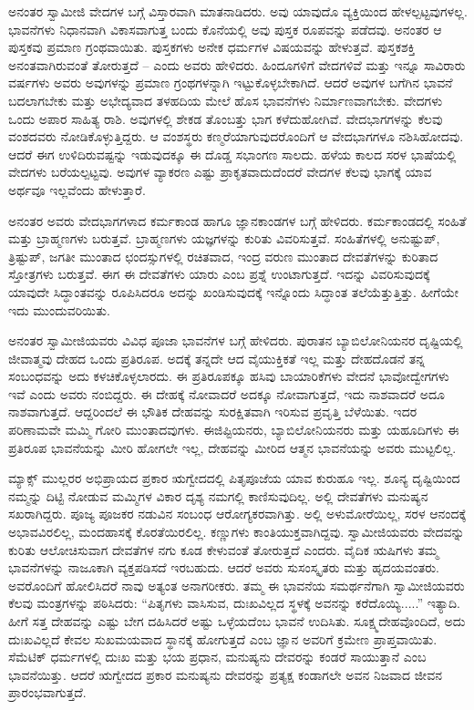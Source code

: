 ಅನಂತರ ಸ್ವಾಮೀಜಿ ವೇದಗಳ ಬಗ್ಗೆ ವಿಸ್ತಾರವಾಗಿ ಮಾತನಾಡಿದರು. ಅವು ಯಾವುದೊ ವ್ಯಕ್ತಿಯಿಂದ ಹೇಳಲ್ಪಟ್ಟವುಗಳಲ್ಲ. ಭಾವನೆಗಳು ನಿಧಾನವಾಗಿ ವಿಕಾಸವಾಗುತ್ತ ಬಂದು ಕೊನೆಯಲ್ಲಿ ಅವು ಪುಸ್ತಕ ರೂಪವನ್ನು ಪಡೆದವು. ಅನಂತರ ಆ ಪುಸ್ತಕವು ಪ್ರಮಾಣ ಗ್ರಂಥವಾಯಿತು. ಪುಸ್ತಕಗಳು ಅನೇಕ ಧರ್ಮಗಳ ವಿಷಯವನ್ನು ಹೇಳುತ್ತವೆ. ಪುಸ್ತಕಶಕ್ತಿ ಅನಂತವಾಗಿರುವಂತೆ ತೋರುತ್ತದೆ – ಎಂದು ಅವರು ಹೇಳಿದರು. ಹಿಂದೂಗಳಿಗೆ ವೇದಗಳಿವೆ ಮತ್ತು ಇನ್ನೂ ಸಾವಿರಾರು ವರ್ಷಗಳು ಅವರು ಅವುಗಳನ್ನು ಪ್ರಮಾಣ ಗ್ರಂಥಗಳನ್ನಾಗಿ ಇಟ್ಟುಕೊಳ್ಳಬೇಕಾಗಿದೆ. ಆದರೆ ಅವುಗಳ ಬಗೆಗಿನ ಭಾವನೆ ಬದಲಾಗಬೇಕು ಮತ್ತು ಅಭೇದ್ಯವಾದ ತಳಹದಿಯ ಮೇಲೆ ಹೊಸ ಭಾವನೆಗಳು ನಿರ್ಮಾಣವಾಗಬೇಕು. ವೇದಗಳು ಒಂದು ಅಪಾರ ಸಾಹಿತ್ಯ ರಾಶಿ. ಅವುಗಳಲ್ಲಿ ಶೇಕಡ ತೊಂಬತ್ತು ಭಾಗ ಕಳೆದುಹೋಗಿವೆ. ವೇದಭಾಗಗಳನ್ನು ಕೆಲವು ವಂಶದವರು ನೋಡಿಕೊಳ್ಳುತ್ತಿದ್ದರು. ಆ ವಂಶಸ್ಥರು ಕಣ್ಮರೆಯಾಗುವುದರೊಂದಿಗೆ ಆ ವೇದಭಾಗಗಳೂ ನಶಿಸಿಹೋದವು. ಆದರೆ ಈಗ ಉಳಿದಿರುವಷ್ಟನ್ನು ಇಡುವುದಕ್ಕೂ ಈ ದೊಡ್ಡ ಸಭಾಂಗಣ ಸಾಲದು. ಹಳೆಯ ಕಾಲದ ಸರಳ ಭಾಷೆಯಲ್ಲಿ ವೇದಗಳು ಬರೆಯಲ್ಪಟ್ಟವು. ಅವುಗಳ ವ್ಯಾಕರಣ ಎಷ್ಟು ಪ್ರಾಕೃತವಾದುದೆಂದರೆ ವೇದಗಳ ಕೆಲವು ಭಾಗಕ್ಕೆ ಯಾವ ಅರ್ಥವೂ ಇಲ್ಲವೆಂದು ಹೇಳುತ್ತಾರೆ. 

ಅನಂತರ ಅವರು ವೇದಭಾಗಗಳಾದ ಕರ್ಮಕಾಂಡ ಹಾಗೂ ಜ್ಞಾನಕಾಂಡಗಳ ಬಗ್ಗೆ ಹೇಳಿದರು. ಕರ್ಮಕಾಂಡದಲ್ಲಿ ಸಂಹಿತೆ ಮತ್ತು ಬ್ರಾಹ್ಮಣಗಳು ಬರುತ್ತವೆ. ಬ್ರಾಹ್ಮಣಗಳು ಯಜ್ಞಗಳನ್ನು ಕುರಿತು ವಿವರಿಸುತ್ತವೆ. ಸಂಹಿತೆಗಳಲ್ಲಿ ಅನುಷ್ಟುಪ್​, ತ್ರಿಷ್ಟುಪ್​, ಜಗತೀ ಮುಂತಾದ ಛಂದಸ್ಸುಗಳಲ್ಲಿ ರಚಿತವಾದ, ಇಂದ್ರ ವರುಣ ಮುಂತಾದ ದೇವತೆಗಳನ್ನು ಕುರಿತಾದ ಸ್ತೋತ್ರಗಳು ಬರುತ್ತವೆ. ಈಗ ಈ ದೇವತೆಗಳು ಯಾರು ಎಂಬ ಪ್ರಶ್ನೆ ಉಂಟಾಗುತ್ತದೆ. ಇದನ್ನು ವಿವರಿಸುವುದಕ್ಕೆ ಯಾವುದೇ ಸಿದ್ಧಾಂತವನ್ನು ರೂಪಿಸಿದರೂ ಅದನ್ನು ಖಂಡಿಸುವುದಕ್ಕೆ ಇನ್ನೊಂದು ಸಿದ್ಧಾಂತ ತಲೆಯೆತ್ತುತ್ತಿತ್ತು. ಹೀಗೆಯೇ ಇದು ಮುಂದುವರಿಯಿತು. 

ಅನಂತರ ಸ್ವಾಮೀಜಿಯವರು ವಿವಿಧ ಪೂಜಾ ಭಾವನೆಗಳ ಬಗ್ಗೆ ಹೇಳಿದರು. ಪುರಾತನ ಬ್ಯಾಬಿಲೋನಿಯನರ ದೃಷ್ಟಿಯಲ್ಲಿ ಜೀವಾತ್ಮವು ದೇಹದ ಒಂದು ಪ್ರತಿರೂಪ. ಅದಕ್ಕೆ ತನ್ನದೇ ಆದ ವೈಯುಕ್ತಿಕತೆ ಇಲ್ಲ ಮತ್ತು ದೇಹದೊಡನೆ ತನ್ನ ಸಂಬಂಧವನ್ನು ಅದು ಕಳಚಿಕೊಳ್ಳಲಾರದು. ಈ ಪ್ರತಿರೂಪಕ್ಕೂ ಹಸಿವು ಬಾಯಾರಿಕೆಗಳು ವೇದನೆ ಭಾವೋದ್ವೇಗಗಳು ಇವೆ ಎಂದು ಅವರು ನಂಬಿದ್ದರು. ಈ ದೇಹಕ್ಕೆ ನೋವಾದರೆ ಅದಕ್ಕೂ ನೋವಾಗುತ್ತದೆ, ಇದು ನಾಶವಾದರೆ ಅದೂ ನಾಶವಾಗುತ್ತದೆ. ಆದ್ದರಿಂದಲೆ ಈ ಭೌತಿಕ ದೇಹವನ್ನು ಸುರಕ್ಷಿತವಾಗಿ ಇರಿಸುವ ಪ್ರವೃತ್ತಿ ಬೆಳೆಯಿತು. ಇದರ ಪರಿಣಾಮವೇ ಮಮ್ಮಿ ಗೋರಿ ಮುಂತಾದವುಗಳು. ಈಜಿಪ್ಟಿಯನರು, ಬ್ಯಾಬಿಲೋನಿಯನರು ಮತ್ತು ಯಹೂದಿಗಳು ಈ ಪ್ರತಿರೂಪ ಭಾವನೆಯನ್ನು ಮೀರಿ ಹೋಗಲೇ ಇಲ್ಲ, ದೇಹವನ್ನು ಮೀರಿದ ಆತ್ಮನ ಭಾವನೆಯನ್ನು ಅವರು ಮುಟ್ಟಲಿಲ್ಲ. 

ಮ್ಯಾಕ್ಸ್ ಮುಲ್ಲರರ ಅಭಿಪ್ರಾಯದ ಪ್ರಕಾರ ಋಗ್ವೇದದಲ್ಲಿ ಪಿತೃಪೂಜೆಯ ಯಾವ ಕುರುಹೂ ಇಲ್ಲ. ಶೂನ್ಯ ದೃಷ್ಟಿಯಿಂದ ನಮ್ಮನ್ನು ದಿಟ್ಟಿ ನೋಡುವ ಮಮ್ಮಿಗಳ ವಿಕಾರ ದೃಶ್ಯ ನಮಗಲ್ಲಿ ಕಾಣಿಸುವುದಿಲ್ಲ. ಅಲ್ಲಿ ದೇವತೆಗಳು ಮನುಷ್ಯನ ಸಖರಾಗಿದ್ದರು. ಪೂಜ್ಯ ಪೂಜಕರ ನಡುವಿನ ಸಂಬಂಧ ಆರೋಗ್ಯಕರವಾಗಿತ್ತು. ಅಲ್ಲಿ ಅಳುಮೋರೆಯಿಲ್ಲ, ಸರಳ ಆನಂದಕ್ಕೆ ಅಭಾವವಿರಲಿಲ್ಲ, ಮಂದಹಾಸಕ್ಕೆ ಕೊರತೆಯಿರಲಿಲ್ಲ. ಕಣ್ಣುಗಳು ಕಾಂತಿಯುಕ್ತವಾಗಿದ್ದವು. ಸ್ವಾಮೀಜಿಯವರು ವೇದವನ್ನು ಕುರಿತು ಆಲೋಚಿಸುವಾಗ ದೇವತೆಗಳ ನಗು ಕೂಡ ಕೇಳುವಂತೆ ತೋರುತ್ತದೆ ಎಂದರು. ವೈದಿಕ ಋಷಿಗಳು ತಮ್ಮ ಭಾವನೆಗಳನ್ನು ನಾಜೂಕಾಗಿ ವ್ಯಕ್ತಪಡಿಸದೆ ಇರಬಹುದು. ಆದರೆ ಅವರು ಸುಸಂಸ್ಕೃತರು ಮತ್ತು ಹೃದಯವಂತರು. ಅವರೊಂದಿಗೆ ಹೋಲಿಸಿದರೆ ನಾವು ಅತ್ಯಂತ ಅನಾಗರೀಕರು. ತಮ್ಮ ಈ ಭಾವನೆಯ ಸಮರ್ಥನೆಗಾಗಿ ಸ್ವಾಮೀಜಿಯವರು ಕೆಲವು ಮಂತ್ರಗಳನ್ನು ಪಠಿಸಿದರು: “ಪಿತೃಗಳು ವಾಸಿಸುವ, ದುಃಖವಿಲ್ಲದ ಸ್ಥಳಕ್ಕೆ ಅವನನ್ನು ಕರೆದೊಯ್ಯಿ.....” ಇತ್ಯಾದಿ. ಹೀಗೆ ಸತ್ತ ದೇಹವನ್ನು ಎಷ್ಟು ಬೇಗ ದಹಿಸಿದರೆ ಅಷ್ಟು ಒಳ್ಳೆಯದೆಂಬ ಭಾವನೆ ಉದಿಸಿತು. ಸೂಕ್ಷ್ಮದೇಹವೊಂದಿದೆ, ಅದು ದುಃಖವಿಲ್ಲದೆ ಕೇವಲ ಸುಖಮಯವಾದ ಸ್ಥಾನಕ್ಕೆ ಹೋಗುತ್ತದೆ ಎಂಬ ಜ್ಞಾನ ಅವರಿಗೆ ಕ್ರಮೇಣ ಪ್ರಾಪ್ತವಾಯಿತು. ಸೆಮೆಟಿಕ್​ ಧರ್ಮಗಳಲ್ಲಿ ದುಃಖ ಮತ್ತು ಭಯ ಪ್ರಧಾನ, ಮನುಷ್ಯನು ದೇವರನ್ನು ಕಂಡರೆ ಸಾಯುತ್ತಾನೆ ಎಂಬ ಭಾವನೆಯಿತ್ತು. ಆದರೆ ಋಗ್ವೇದದ ಪ್ರಕಾರ ಮನುಷ್ಯನು ದೇವರನ್ನು ಪ್ರತ್ಯಕ್ಷ ಕಂಡಾಗಲೇ ಅವನ ನಿಜವಾದ ಜೀವನ ಪ್ರಾರಂಭವಾಗುತ್ತದೆ. 

